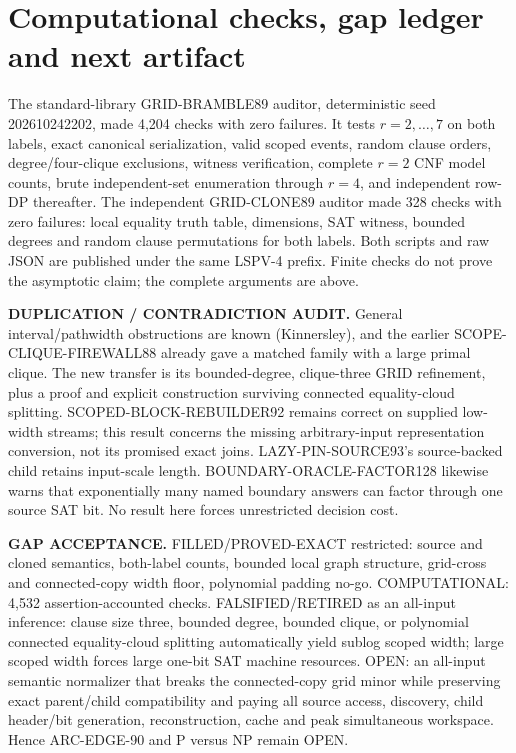 \documentclass[11pt]{article}
\begin{document}
\section{Computational checks, gap ledger and next artifact}
The standard-library GRID-BRAMBLE89 auditor, deterministic seed 202610242202, made 4,204 checks with zero failures. It tests $r=2,\ldots,7$ on both labels, exact canonical serialization, valid scoped events, random clause orders, degree/four-clique exclusions, witness verification, complete $r=2$ CNF model counts, brute independent-set enumeration through $r=4$, and independent row-DP thereafter. The independent GRID-CLONE89 auditor made 328 checks with zero failures: local equality truth table, dimensions, SAT witness, bounded degrees and random clause permutations for both labels. Both scripts and raw JSON are published under the same LSPV-4 prefix. Finite checks do not prove the asymptotic claim; the complete arguments are above.

\textbf{DUPLICATION / CONTRADICTION AUDIT.} General interval/pathwidth obstructions are known (Kinnersley), and the earlier SCOPE-CLIQUE-FIREWALL88 already gave a matched family with a large primal clique. The new transfer is its bounded-degree, clique-three GRID refinement, plus a proof and explicit construction surviving connected equality-cloud splitting. SCOPED-BLOCK-REBUILDER92 remains correct on supplied low-width streams; this result concerns the missing arbitrary-input representation conversion, not its promised exact joins. LAZY-PIN-SOURCE93's source-backed child retains input-scale length. BOUNDARY-ORACLE-FACTOR128 likewise warns that exponentially many named boundary answers can factor through one source SAT bit. No result here forces unrestricted decision cost.

\textbf{GAP ACCEPTANCE.} FILLED/PROVED-EXACT restricted: source and cloned semantics, both-label counts, bounded local graph structure, grid-cross and connected-copy width floor, polynomial padding no-go. COMPUTATIONAL: 4,532 assertion-accounted checks. FALSIFIED/RETIRED as an all-input inference: clause size three, bounded degree, bounded clique, or polynomial connected equality-cloud splitting automatically yield sublog scoped width; large scoped width forces large one-bit SAT machine resources. OPEN: an all-input semantic normalizer that breaks the connected-copy grid minor while preserving exact parent/child compatibility and paying all source access, discovery, child header/bit generation, reconstruction, cache and peak simultaneous workspace. Hence ARC-EDGE-90 and P versus NP remain OPEN.
\end{document}

